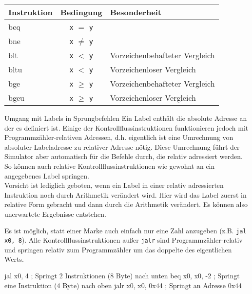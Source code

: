 \begin{table}[H]
  \centering
  \begin{tabular}{>{\ttfamily}l c l}

  	\textbf{Instruktion} & \textbf{Bedingung} & \textbf{Besonderheit}\\
    \toprule

  	beq & \texttt{x} $ = $ \texttt{y} & \\

  	bne & \texttt{x} $ \ne $ \texttt{y} & \\

  	blt & \texttt{x} $ < $ \texttt{y} & Vorzeichenbehafteter Vergleich\\

  	bltu & \texttt{x} $ < $ \texttt{y} & Vorzeichenloser Vergleich\\

  	bge & \texttt{x} $ \ge $ \texttt{y} & Vorzeichenbehafteter Vergleich\\

  	bgeu & \texttt{x} $ \ge $ \texttt{y} & Vorzeichenloser Vergleich\\

  \end{tabular}

\end{table}

\begin{infoblock}{Umgang mit Labels in Sprungbefehlen}
  Ein Label enthält die absolute Adresse an der es definiert ist. Einige der
  Kontrollflussinstruktionen funktionieren jedoch mit Programmzähler-relativen
  Adressen, d.h. eigentlich ist eine Umrechnung von absoluter Labeladresse zu
  relativer Adresse nötig. Diese Umrechnung führt der Simulator aber automatisch
  für die Befehle durch, die relativ adressiert werden. So können auch relative
  Kontrollflussinstruktionen wie gewohnt an ein angegebenes Label springen.\\
	Vorsicht ist lediglich geboten, wenn ein Label in einer relativ adressierten
	Instruktion noch durch Arithmetik verändert wird. Hier wird das Label zuerst
	in relative Form gebracht und dann durch die Arithmetik verändert. Es können
	also unerwartete Ergebnisse entstehen.
\end{infoblock}

\begin{warningblock}
	Es ist möglich, statt einer Marke auch einfach nur eine Zahl anzugeben (z.B. \texttt{jal x0, 8}).
	Alle Kontrollflussinstruktionen außer \texttt{jalr} sind Programmzähler-relativ und springen relativ zum Programmzähler um das doppelte des eigentlichen Werts.\\
\begin{riscv}
jal x0, 4 ; Springt 2 Instruktionen (8 Byte) nach unten
beq x0, x0, -2 ; Springt eine Instruktion (4 Byte) nach oben
jalr x0, x0, 0x44 ; Springt an Adresse 0x44
\end{riscv}
\end{warningblock}


